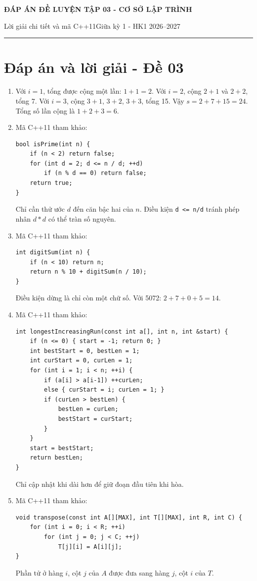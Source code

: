 \documentclass[11pt,a4paper]{article}
\newcommand{\examtitle}[4]{\begin{center}{\Large\bfseries\color{hcmusblue}#1}\par\vspace{3pt}{\large\bfseries #2}\par\vspace{3pt}\small #3\quad\textbullet\quad #4\end{center}\vspace{5pt}\hrule\vspace{8pt}}
\begin{document}
\small
\examtitle{ĐÁP ÁN ĐỀ LUYỆN TẬP 03 - CƠ SỞ LẬP TRÌNH}{CƠ SỞ LẬP TRÌNH - HCMUS (theo lịch học tuần 1--5)}{Lời giải chi tiết và mã C++11}{Giữa kỳ 1 - HK1 2026--2027}

\section*{Đáp án và lời giải - Đề 03}
\begin{enumerate}
\item \begin{minipage}[t]{\linewidth}
Với $i=1$, tổng được cộng một lần: $1+1=2$. Với $i=2$, cộng $2+1$ và $2+2$, tổng 7. Với $i=3$, cộng $3+1$, $3+2$, $3+3$, tổng 15. Vậy $s=2+7+15=24$. Tổng số lần cộng là $1+2+3=6$.
\end{minipage}
\item \begin{minipage}[t]{\linewidth}
Mã C++11 tham khảo:
\begin{lstlisting}
bool isPrime(int n) {
    if (n < 2) return false;
    for (int d = 2; d <= n / d; ++d)
        if (n % d == 0) return false;
    return true;
}
\end{lstlisting}
Chỉ cần thử ước $d$ đến căn bậc hai của $n$. Điều kiện \texttt{d <= n/d} tránh phép nhân $d*d$ có thể tràn số nguyên.
\end{minipage}
\item \begin{minipage}[t]{\linewidth}
Mã C++11 tham khảo:
\begin{lstlisting}
int digitSum(int n) {
    if (n < 10) return n;
    return n % 10 + digitSum(n / 10);
}
\end{lstlisting}
Điều kiện dừng là chỉ còn một chữ số. Với 5072: $2+7+0+5=14$.
\end{minipage}
\item \begin{minipage}[t]{\linewidth}
Mã C++11 tham khảo:
\begin{lstlisting}
int longestIncreasingRun(const int a[], int n, int &start) {
    if (n <= 0) { start = -1; return 0; }
    int bestStart = 0, bestLen = 1;
    int curStart = 0, curLen = 1;
    for (int i = 1; i < n; ++i) {
        if (a[i] > a[i-1]) ++curLen;
        else { curStart = i; curLen = 1; }
        if (curLen > bestLen) {
            bestLen = curLen;
            bestStart = curStart;
        }
    }
    start = bestStart;
    return bestLen;
}
\end{lstlisting}
Chỉ cập nhật khi dài hơn để giữ đoạn đầu tiên khi hòa.
\end{minipage}
\item \begin{minipage}[t]{\linewidth}
Mã C++11 tham khảo:
\begin{lstlisting}
void transpose(const int A[][MAX], int T[][MAX], int R, int C) {
    for (int i = 0; i < R; ++i)
        for (int j = 0; j < C; ++j)
            T[j][i] = A[i][j];
}
\end{lstlisting}
Phần tử ở hàng $i$, cột $j$ của $A$ được đưa sang hàng $j$, cột $i$ của $T$.
\end{minipage}
\end{enumerate}
\end{document}
